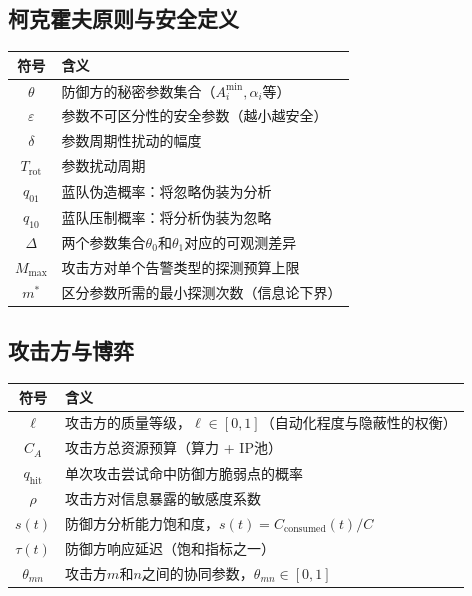 \documentclass[11pt,a4paper]{article}
\begin{document}
\subsection{柯克霍夫原则与安全定义}

\begin{center}
\begin{xltabular}{\textwidth}{c|X}
\toprule
\textbf{符号} & \textbf{含义} \\
\midrule
$\theta$ & 防御方的秘密参数集合（$A_i^{\min}, \alpha_i$等） \\
$\varepsilon$ & 参数不可区分性的安全参数（越小越安全） \\
$\delta$ & 参数周期性扰动的幅度 \\
$T_{\text{rot}}$ & 参数扰动周期 \\
$q_{01}$ & 蓝队伪造概率：将忽略伪装为分析 \\
$q_{10}$ & 蓝队压制概率：将分析伪装为忽略 \\
$\Delta$ & 两个参数集合$\theta_0$和$\theta_1$对应的可观测差异 \\
$M_{\max}$ & 攻击方对单个告警类型的探测预算上限 \\
$m^*$ & 区分参数所需的最小探测次数（信息论下界） \\
\bottomrule
\end{xltabular}
\end{center}

\subsection{攻击方与博弈}

\begin{center}
\begin{xltabular}{\textwidth}{c|X}
\toprule
\textbf{符号} & \textbf{含义} \\
\midrule
$\ell$ & 攻击方的质量等级，$\ell \in [0,1]$（自动化程度与隐蔽性的权衡） \\
$C_A$ & 攻击方总资源预算（算力 + IP池） \\
$q_{\text{hit}}$ & 单次攻击尝试命中防御方脆弱点的概率 \\
$\rho$ & 攻击方对信息暴露的敏感度系数 \\
$s(t)$ & 防御方分析能力饱和度，$s(t) = C_{\text{consumed}}(t)/C$ \\
$\tau(t)$ & 防御方响应延迟（饱和指标之一） \\
$\theta_{mn}$ & 攻击方$m$和$n$之间的协同参数，$\theta_{mn} \in [0,1]$ \\
\bottomrule
\end{xltabular}
\end{center}
\end{document}
